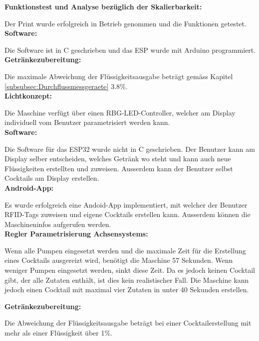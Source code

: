 \textbf{Funktionstest und Analyse bezüglich der Skalierbarkeit:}

Der Print wurde erfolgreich in Betrieb genommen und die Funktionen getestet.\\

\textbf{Software:}

Die Software ist in C geschrieben und das ESP wurde mit Arduino programmiert.\\

\textbf{Getränkezubereitung:}

Die maximale Abweichung der Flüssigkeitsausgabe beträgt gemäss Kapitel \ref{subsubsec:Durchflussmessgeraete} 3.8\%.\\

\textbf{Lichtkonzept:}

Die Maschine verfügt über einen RBG-LED-Controller, welcher am Display individuell vom Benutzer parametrisiert werden kann.\\

\textbf{Software:}

Die Software für das ESP32 wurde nicht in C geschrieben. Der Benutzer kann am Display selber entscheiden, welches Getränk wo steht und kann auch neue Flüssigkeiten erstellten und zuweisen. Ausserdem kann der Benutzer selbst Cocktails am Display erstellen.\\

\textbf{Android-App:}

Es wurde erfolgreich eine Andoid-App implementiert, mit welcher der Benutzer RFID-Tags zuweisen und eigene Cocktails erstellen kann. Ausserdem können die Maschineninfos aufgerufen werden.\\

\textbf{Regler Parametrisierung Achsensystems:}

Wenn alle Pumpen eingesetzt werden und die maximale Zeit für die Erstellung eines Cocktails ausgereizt wird, benötigt die Maschine 57 Sekunden. Wenn weniger Pumpen eingesetzt werden, sinkt diese Zeit. Da es jedoch keinen Cocktail gibt, der alle Zutaten enthält, ist dies kein realistischer Fall. Die Maschine kann jedoch einen Cocktail mit maximal vier Zutaten in unter 40 Sekunden erstellen.

\textbf{Getränkezubereitung:}

Die Abweichung der Flüssigkeitsausgabe beträgt bei einer Cocktailerstellung mit mehr als einer Flüssigkeit über 1\%.

\newpage
